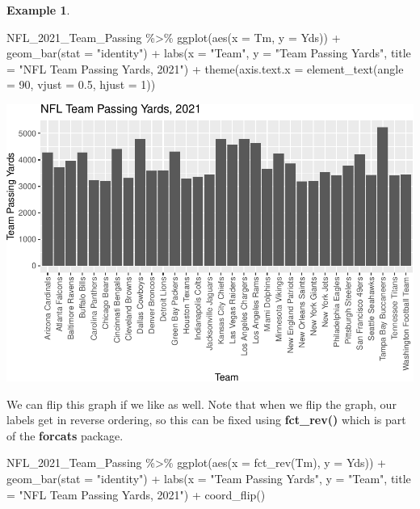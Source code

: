 \documentclass[
  11pt,
]{book}
\newenvironment{Shaded}{\begin{snugshade}}{\end{snugshade}}
\newcommand{\AttributeTok}[1]{\textcolor[rgb]{0.77,0.63,0.00}{#1}}
\newcommand{\DecValTok}[1]{\textcolor[rgb]{0.00,0.00,0.81}{#1}}
\newcommand{\FloatTok}[1]{\textcolor[rgb]{0.00,0.00,0.81}{#1}}
\newcommand{\FunctionTok}[1]{\textcolor[rgb]{0.00,0.00,0.00}{#1}}
\newcommand{\NormalTok}[1]{#1}
\newcommand{\SpecialCharTok}[1]{\textcolor[rgb]{0.00,0.00,0.00}{#1}}
\newcommand{\StringTok}[1]{\textcolor[rgb]{0.31,0.60,0.02}{#1}}
\theoremstyle{definition}
\theoremstyle{definition}
\newtheorem{example}{Example}[chapter]
\theoremstyle{definition}
\theoremstyle{definition}
\theoremstyle{remark}
\begin{document}
\begin{example}
\begin{Shaded}
\begin{Highlighting}[]
\NormalTok{NFL\_2021\_Team\_Passing }\SpecialCharTok{\%\textgreater{}\%}
    \FunctionTok{ggplot}\NormalTok{(}\FunctionTok{aes}\NormalTok{(}\AttributeTok{x =}\NormalTok{ Tm, }\AttributeTok{y =}\NormalTok{ Yds)) }\SpecialCharTok{+} \FunctionTok{geom\_bar}\NormalTok{(}\AttributeTok{stat =} \StringTok{"identity"}\NormalTok{) }\SpecialCharTok{+} \FunctionTok{labs}\NormalTok{(}\AttributeTok{x =} \StringTok{"Team"}\NormalTok{,}
    \AttributeTok{y =} \StringTok{"Team Passing Yards"}\NormalTok{, }\AttributeTok{title =} \StringTok{"NFL Team Passing Yards, 2021"}\NormalTok{) }\SpecialCharTok{+} \FunctionTok{theme}\NormalTok{(}\AttributeTok{axis.text.x =} \FunctionTok{element\_text}\NormalTok{(}\AttributeTok{angle =} \DecValTok{90}\NormalTok{,}
    \AttributeTok{vjust =} \FloatTok{0.5}\NormalTok{, }\AttributeTok{hjust =} \DecValTok{1}\NormalTok{))}
\end{Highlighting}
\end{Shaded}

\includegraphics{series_files/figure-latex/bar2-1.pdf}

\vfill
\newpage

We can flip this graph if we like as well. Note that when we flip the graph, our labels get in reverse ordering, so this can be fixed using \textbf{fct\_rev()} which is part of the \textbf{forcats} package.

\begin{Shaded}
\begin{Highlighting}[]
\NormalTok{NFL\_2021\_Team\_Passing }\SpecialCharTok{\%\textgreater{}\%}
    \FunctionTok{ggplot}\NormalTok{(}\FunctionTok{aes}\NormalTok{(}\AttributeTok{x =} \FunctionTok{fct\_rev}\NormalTok{(Tm), }\AttributeTok{y =}\NormalTok{ Yds)) }\SpecialCharTok{+} \FunctionTok{geom\_bar}\NormalTok{(}\AttributeTok{stat =} \StringTok{"identity"}\NormalTok{) }\SpecialCharTok{+} \FunctionTok{labs}\NormalTok{(}\AttributeTok{x =} \StringTok{"Team Passing Yards"}\NormalTok{,}
    \AttributeTok{y =} \StringTok{"Team"}\NormalTok{, }\AttributeTok{title =} \StringTok{"NFL Team Passing Yards, 2021"}\NormalTok{) }\SpecialCharTok{+} \FunctionTok{coord\_flip}\NormalTok{()}
\end{Highlighting}
\end{Shaded}


\end{example}
\end{document}

